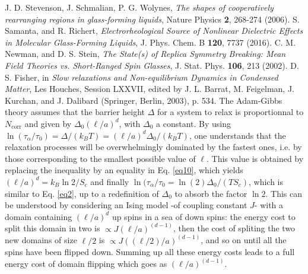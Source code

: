 \documentclass[single column,pre]{revtex4}
\begin{document}
\begin{thebibliography}{99}
 J. D. Stevenson, J. Schmalian, P. G. Wolynes,  \textit{The shapes of cooperatively rearranging regions in glass-forming liquids}, Nature Physics {\bf 2}, 268-274 (2006).
 S. Samanta, and R. Richert, \textit{Electrorheological Source of Nonlinear Dielectric Effects in Molecular Glass-Forming Liquids}, J. Phys. Chem. B {\bf 120}, 7737 (2016).
 C. M. Newman, and D. S. Stein, \textit{The State(s) of Replica Symmetry Breaking: Mean Field Theories vs. Short-Ranged Spin Glasses}, J. Stat. Phys. {\bf 106}, 213 (2002).
 D. S. Fisher, in {\it Slow relaxations and Non-equilibrium Dynamics in Condensed Matter}, Les Houches, Session LXXVII, edited by J. L. Barrat, M. Feigelman, J. Kurchan, and J. Dalibard (Springer, Berlin, 2003), p. 534.
 The Adam-Gibbs theory assumes that the barrier height $\Delta$ for a system to relax is proportionnal to $N_{\text{corr}}$ and given by $\Delta_0 (\ell/a)^d$, 
with $\Delta_0$ a constant. By using $\ln(\tau_{\alpha}/\tau_0) =  \Delta /(k_B T) =  (\ell/a)^d \Delta_0/(k_B T)$, one understands that the relaxation processes will be 
overwhelmingly dominated by the fastest ones, i.e. by those corresponding to the smallest possible value of $\ell$. This value is obtained by replacing the inequality by an equality 
in Eq. \ref{eq10}, which yields $(\ell / a)^d =k_B \ln{2} /S_c$ and finally $\ln(\tau_{\alpha}/\tau_0 = \ln{(2)} \Delta_0 /(T S_c)$, which is similar to Eq. \ref{eq2}, 
up to a redefinition of $\Delta_0$ to absorb the factor $\ln 2$.
 This can be understood by considering an Ising model -of coupling constant $J$- with a domain 
containing $(\ell/a)^d$ up spins in a sea of down spins: the energy cost to split this domain in two is $\propto J (\ell /a)^{(d-1)}$, then the cost of spliting the two 
new domains of size $\ell /2$ is $\propto J ((\ell/2) /a)^{(d-1)}$, and so on until all the spins have been flipped down. Summing up all these energy costs leads to a 
full energy cost of domain flipping which goes as $(\ell /a)^{(d-1)}$. 
\end{thebibliography} 
\end{document}

